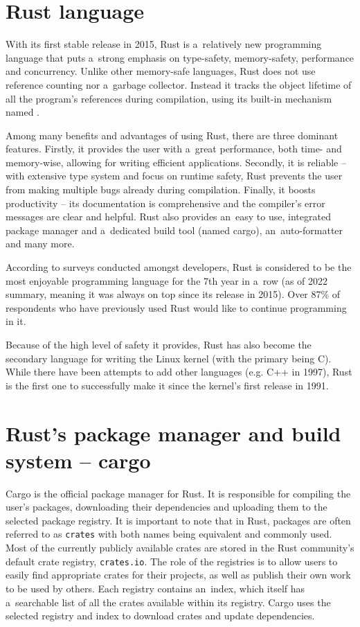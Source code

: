 \documentclass[licencjacka,en]{pracamgr}
\begin{document}
\section{Rust language}\label{r:section_rust_language}

With its first stable release in 2015, Rust is a~relatively new programming language that
puts a~strong emphasis on type-safety, memory-safety, performance and concurrency. Unlike
other memory-safe languages, Rust does not use reference counting nor a~garbage collector.
Instead it tracks the object lifetime of all the program's references during compilation,
using its built-in mechanism named .

Among many benefits and advantages of using Rust, there are three dominant features. Firstly,
it provides the user with a~great performance, both time- and memory-wise, allowing for
writing efficient applications. Secondly, it is reliable -- with extensive type system and
focus on runtime safety, Rust prevents the user from making multiple bugs
already during compilation. Finally, it boosts productivity -- its documentation is
comprehensive and the compiler's error messages are clear and helpful. Rust also provides
an~easy to use, integrated package manager and a~dedicated build tool (named cargo),
an~auto-formatter and many more.

According to surveys \cite{survey} conducted amongst developers, Rust is considered to be the most
enjoyable programming language for the 7th year in a~row (as of 2022 summary, meaning it was always
on top since its release in 2015). Over 87\% of respondents who have previously used Rust would
like to continue programming in it.

Because of the high level of safety it provides, Rust has also become the secondary
language for writing the Linux kernel (with the primary being C). While there have been
attempts to add other languages (e.g. C++ in 1997), Rust is the first one to successfully
make it since the kernel's first release in 1991.

\section{Rust's package manager and build system -- cargo}\label{r:section_cargo}

Cargo is the official package manager for Rust. It is responsible for compiling the user's
packages, downloading their dependencies and uploading them to the selected package registry.
It is important to note that in Rust, packages are often referred to as \texttt{crates} with both
names being equivalent and commonly used. Most of the currently publicly available crates are
stored in the Rust community's default crate registry, \texttt{crates.io}. The role of the
registries is to allow users to easily find appropriate crates for their projects, as well as
publish their own work to be used by others. Each registry contains an~index, which itself has
a~searchable list of all the crates available within its registry. Cargo uses the selected registry
and index to download crates and update dependencies.
\end{document}
